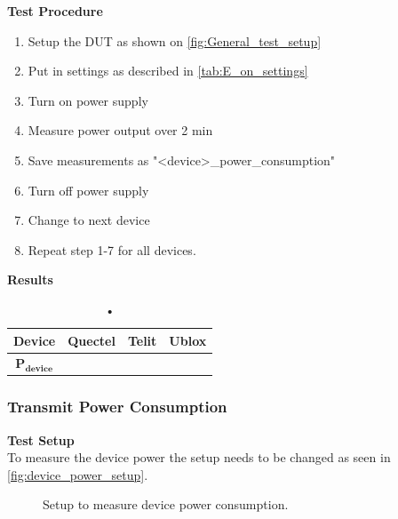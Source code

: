 \textbf{Test Procedure}\\
\begin{enumerate}
\item Setup the \gls{DUT} as shown on \autoref{fig:General_test_setup}
\item Put in settings as described in \autoref{tab:E_on_settings} 
\item Turn on power supply 
\item Measure power output over 2 min
\item Save measurements as "<device>\_power\_consumption"
\item Turn off power supply
\item Change to next device
\item Repeat step 1-7 for all devices.
\end{enumerate}



























\textbf{Results}\\
\begin{table}[H]
\centering
\begin{tabular}{|c|c|c|c|}\hline
\textbf{Device}	& Quectel	& Telit & Ublox \\ \hline
$\mathbf{P_{device}}$	& & & \\ \hline
\end{tabular}
\caption{•}
\label{tab:device_power_results}
\end{table}

\subsubsection{Transmit Power Consumption}
\textbf{Test Setup}\\
To measure the device power the setup needs to be changed as seen in \autoref{fig:device_power_setup}.
\begin{figure}[H]
\centering
{}
\caption{Setup to measure device power consumption.}
\label{fig:device_power_setup}
\end{figure}


